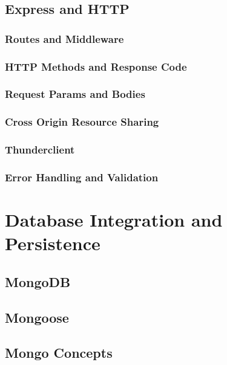 \documentclass{article}[12pt]
\begin{document}
    \subsection{Express and HTTP}
    
    \subsubsection{Routes and Middleware}
    
    \subsubsection{HTTP Methods and Response Code}
    
    \subsubsection{Request Params and Bodies}
    
    \subsubsection{Cross Origin Resource Sharing}
    
    \subsubsection{Thunderclient}
    
    \subsubsection{Error Handling and Validation}


    \section{Database Integration and Persistence}
    \subsection{MongoDB}
    
    \subsection{Mongoose}
    
    \subsection{Mongo Concepts}
    
\end{document}
